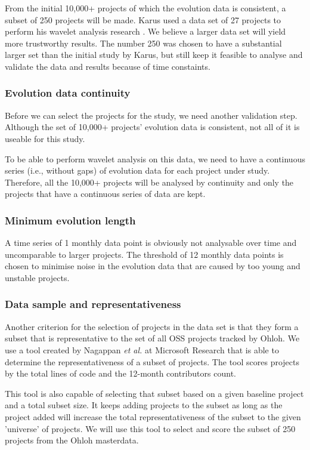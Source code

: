 From the initial 10,000+ projects of which the evolution data is consistent, a
subset of 250 projects will be made. Karus used a data set of 27 projects to
perform his wavelet analysis research \cite{karus2013}. We believe a larger
data set will yield more trustworthy results. The number 250 was chosen to have
a substantial larger set than the initial study by Karus, but still keep it
feasible to analyse and validate the data and results because of time
constaints.

\subsubsection{Evolution data continuity}
Before we can select the projects for the study, we need another validation
step. Although the set of 10,000+ projects' evolution data is consistent, not
all of it is useable for this study.

To be able to perform wavelet analysis on this data, we need to have a
continuous series (i.e., without gaps) of evolution data for each project under
study. Therefore, all the 10,000+ projects will be analysed by continuity and
only the projects that have a continuous series of data are kept.

\subsubsection{Minimum evolution length}
A time series of 1 monthly data point is obviously not analysable over time and
uncomparable to larger projects. The threshold of 12 monthly data points is
chosen to minimise noise in the evolution data that are caused by too young and
unstable projects.

\subsubsection{Data sample and representativeness}
Another criterion for the selection of projects in the data set is that they
form a subset that is representative to the set of all OSS projects tracked by
Ohloh. We use a tool created by Nagappan \emph{et al. }\rm\cite{nagappan} at
Microsoft Research that is able to determine the representativeness of a subset of
projects. The tool scores projects by the total lines of code
and the 12-month contributors count.

This tool is also capable of selecting that subset based on a given baseline
project and a total subset size. It keeps adding projects to the subset as long
as the project added will increase the total representativeness of the subset
to the given 'universe' of projects. We will use this tool to select and score
the subset of 250 projects from the Ohloh masterdata.



